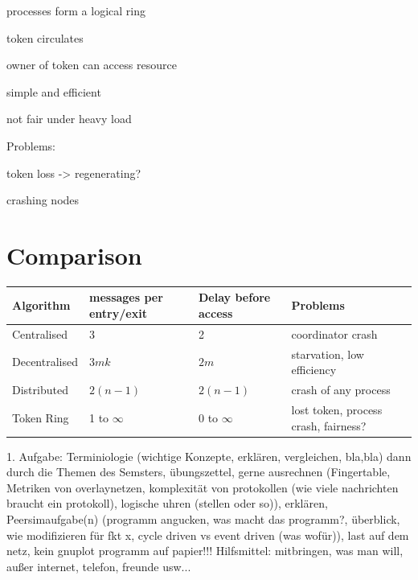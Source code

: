\documentclass[ngerman,a4paper]{report}
\begin{document}
\begin{compactitem}
	\item processes form a logical ring
	\item token circulates
	\item owner of token can access resource
	\item simple and efficient
	\item not fair under heavy load
\end{compactitem}
Problems:\begin{compactitem}
	\item token loss -> regenerating?
	\item crashing nodes
\end{compactitem}

\section{Comparison}
\begin{tabular} {l|l|l|l}
Algorithm&messages per entry/exit&Delay before access&Problems\\
\hline
Centralised& 3& 2&coordinator crash\\
Decentralised&$3mk$&$2m$&starvation, low efficiency\\
Distributed&$2(n-1)$&$2(n-1)$&crash of any process\\
Token Ring& 1 to $\infty$&$0$ to $\infty$&lost token, process crash, fairness?
\end{tabular}






1. Aufgabe: Terminiologie (wichtige Konzepte, erklären, vergleichen, bla,bla)
dann durch die Themen des Semsters, übungszettel, gerne ausrechnen (Fingertable, Metriken von overlaynetzen, komplexität von protokollen (wie viele nachrichten braucht ein protokoll), logische uhren (stellen oder so)), erklären, Peersimaufgabe(n) (programm angucken, was macht das programm?, überblick, wie modifizieren für fkt x, cycle driven vs event driven (was wofür)), last auf dem netz, kein gnuplot programm auf papier!!!
Hilfsmittel: mitbringen, was man will, außer internet, telefon, freunde usw...
\end{document}
